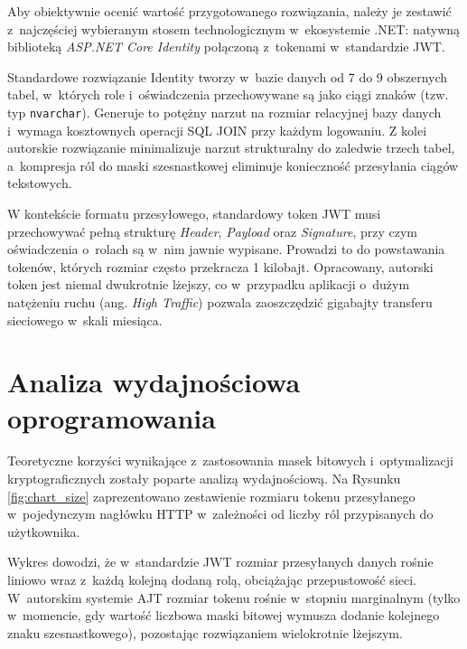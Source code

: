 \documentclass{SGGW-thesis}
\begin{document}
Aby obiektywnie ocenić wartość przygotowanego rozwiązania, należy je zestawić z~najczęściej wybieranym stosem technologicznym w~ekosystemie .NET: natywną biblioteką \textit{ASP.NET Core Identity} połączoną z~tokenami w~standardzie JWT.

Standardowe rozwiązanie Identity tworzy w~bazie danych od 7 do 9 obszernych tabel, w~których role i~oświadczenia przechowywane są jako ciągi znaków (tzw. typ \texttt{nvarchar}). Generuje to potężny narzut na rozmiar relacyjnej bazy danych i~wymaga kosztownych operacji SQL JOIN przy każdym logowaniu. 
Z kolei autorskie rozwiązanie minimalizuje narzut strukturalny do zaledwie trzech tabel, a~kompresja ról do maski szesnastkowej eliminuje konieczność przesyłania ciągów tekstowych.

W kontekście formatu przesyłowego, standardowy token JWT musi przechowywać pełną strukturę \textit{Header}, \textit{Payload} oraz \textit{Signature}, przy czym oświadczenia o~rolach są w~nim jawnie wypisane. Prowadzi to do powstawania tokenów, których rozmiar często przekracza 1 kilobajt. Opracowany, autorski token jest niemal dwukrotnie lżejszy, co w~przypadku aplikacji o~dużym natężeniu ruchu (ang. \textit{High Traffic}) pozwala zaoszczędzić gigabajty transferu sieciowego w~skali miesiąca.

\section{Analiza wydajnościowa oprogramowania}

Teoretyczne korzyści wynikające z~zastosowania masek bitowych i~optymalizacji kryptograficznych zostały poparte analizą wydajnościową. Na Rysunku \ref{fig:chart_size} zaprezentowano zestawienie rozmiaru tokenu przesyłanego w~pojedynczym nagłówku HTTP w~zależności od liczby ról przypisanych do użytkownika.

Wykres dowodzi, że w~standardzie JWT rozmiar przesyłanych danych rośnie liniowo wraz z~każdą kolejną dodaną rolą, obciążając przepustowość sieci. W~autorskim systemie AJT rozmiar tokenu rośnie w~stopniu marginalnym (tylko w~momencie, gdy wartość liczbowa maski bitowej wymusza dodanie kolejnego znaku szesnastkowego), pozostając rozwiązaniem wielokrotnie lżejszym.
\end{document}
